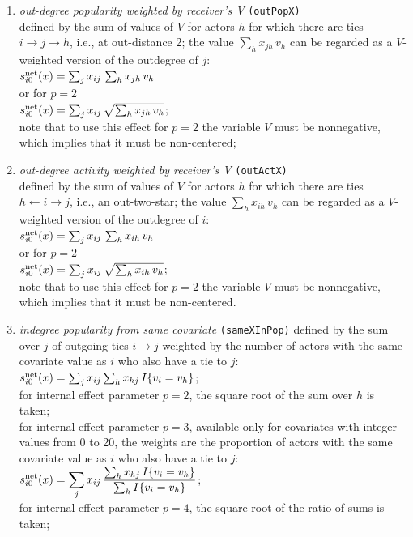 \documentclass[a4paper,fleqn,11pt]{article}
\newcommand{\+}{\, + \,}
\newcommand{\vit}{\theenumi}
\begin{document}
\begin{enumerate}
 \item {\em out-degree popularity weighted by receiver's V }  \texttt{(outPopX)}\\
 defined by the sum of values of $V$ for actors $h$
 for which there are ties  $ i \rightarrow j \rightarrow h$,
 i.e., at out-distance 2;
 the value $\sum_h x_{jh}\,v_h$ can be regarded as a $V$-weighted
 version of the outdegree of $j$:\\
 $s^{\rm net}_{i\vit}(x) =  \sum_j x_{ij}\, \sum_h x_{jh}\,v_h  $ \\
 or for $p=2$ \\
   $s^{\rm net}_{i\vit}(x) =  \sum_j x_{ij}\, \sqrt{\sum_h x_{jh}\,v_h}   $;\\
 note that to use this effect for $p=2$ the variable $V$ must be nonnegative,
 which implies that it must be non-centered;

 \item {\em out-degree activity weighted by receiver's V }   \texttt{(outActX)}\\
 defined by the sum of values of $V$ for actors $h$
 for which there are ties  $h \leftarrow i \rightarrow j$,
 i.e., an out-two-star;
 the value $\sum_h x_{ih}\,v_h$ can be regarded as a $V$-weighted
 version of the outdegree of $i$:\\
 $s^{\rm net}_{i\vit}(x) =  \sum_j x_{ij}\, \sum_h x_{ih}\,v_h  $ \\
 or for $p=2$ \\
   $s^{\rm net}_{i\vit}(x) =  \sum_j x_{ij}\, \sqrt{\sum_h x_{ih}\,v_h}   $;\\
 note that to use this effect for $p=2$ the variable $V$ must be nonnegative,
 which implies that it must be non-centered.

 \item {\em indegree popularity from same covariate}
\texttt{(sameXInPop)} defined by the sum over $j$ of outgoing ties $i \rightarrow j$ weighted by the
number of actors with the same covariate value as $i$ who also have a tie to $j$:\\
 $s^{\rm net}_{i\vit}(x) = \sum_j x_{ij} \sum_h x_{hj}\, I\{v_i = v_h \} $;\\
 for internal effect parameter $p=2$, the square root of the sum over $h$ is taken;\\
 for internal effect parameter $p=3$, available only for
 covariates with integer values from 0 to 20, the weights are the
 proportion of actors with the same covariate value as $i$ who also have a tie to $j$:\\
 $\displaystyle s^{\rm net}_{i\vit}(x) = \sum_j x_{ij} \, \frac{\sum_h x_{hj}\, I\{v_i = v_h \}}
                {\sum_h I\{v_i = v_h \}} $;\\
 for internal effect parameter $p=4$, the square root of the ratio of sums is taken;



\end{enumerate}
\end{document}
